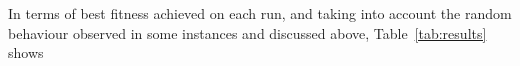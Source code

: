 \documentclass[runningheads]{llncs}
\begin{document}
In terms of best fitness achieved on each run, and taking into account the
random behaviour observed in some instances and discussed above,
Table~\ref{tab:results} shows


%
\end{document}

